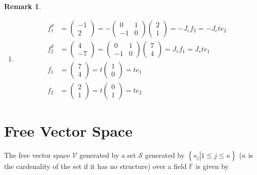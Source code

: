 \documentclass[aps,preprint]{revtex4}
\newtheorem{remark}[theorem]{Remark}
\begin{document}
\begin{remark}
\begin{enumerate}
\item 
\begin{align}
f_{1}^{d}& =\left( 
\begin{array}{c}
-1 \\ 
2%
\end{array}%
\right) =-\left( 
\begin{array}{cc}
0 & 1 \\ 
-1 & 0%
\end{array}%
\right) \left( 
\begin{array}{c}
2 \\ 
1%
\end{array}%
\right) =-J_{e}f_{2}=-J_{e}te_{2} \\
f_{2}^{d}& =\left( 
\begin{array}{c}
4 \\ 
-7%
\end{array}%
\right) =\left( 
\begin{array}{cc}
0 & 1 \\ 
-1 & 0%
\end{array}%
\right) \left( 
\begin{array}{c}
7 \\ 
4%
\end{array}%
\right) =J_{e}f_{1}=J_{e}te_{1} \\
f_{1}& =\left( 
\begin{array}{c}
7 \\ 
4%
\end{array}%
\right) =t\left( 
\begin{array}{c}
1 \\ 
0%
\end{array}%
\right) =te_{1} \\
f_{2}& =\left( 
\begin{array}{c}
2 \\ 
1%
\end{array}%
\right) =t\left( 
\begin{array}{c}
0 \\ 
1%
\end{array}%
\right) =te_{2}
\end{align}
\end{enumerate}
\end{remark}

\section{Free Vector Space}

\qquad The free vector space $\mathcal{V}$ generated by a set $\mathcal{S}$
generated by $\left\{ \left. s_{j}\right\vert 1\leq j\leq\kappa\right\} $ ($%
\kappa$ is the cardenality of the set if it has no structure) over a field $%
\mathbb{F}$ is given by
\end{document}

